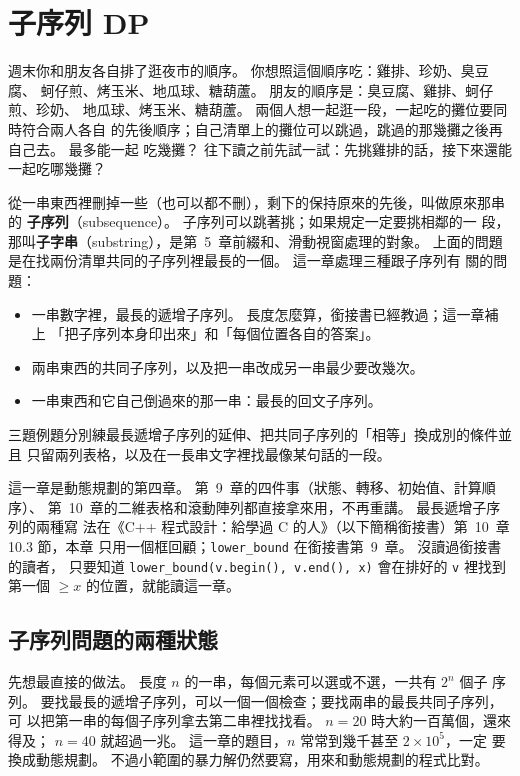 \chapter{子序列 DP}
\label{ch:subseq}

週末你和朋友各自排了逛夜市的順序。 你想照這個順序吃：雞排、珍奶、臭豆腐、
蚵仔煎、烤玉米、地瓜球、糖葫蘆。 朋友的順序是：臭豆腐、雞排、蚵仔煎、珍奶、
地瓜球、烤玉米、糖葫蘆。 兩個人想一起逛一段，一起吃的攤位要同時符合兩人各自
的先後順序；自己清單上的攤位可以跳過，跳過的那幾攤之後再自己去。 最多能一起
吃幾攤？ 往下讀之前先試一試：先挑雞排的話，接下來還能一起吃哪幾攤？

從一串東西裡刪掉一些（也可以都不刪），剩下的保持原來的先後，叫做原來那串的
\textbf{子序列}（subsequence）。 子序列可以跳著挑；如果規定一定要挑相鄰的一
段，那叫\textbf{子字串}（substring），是第~5~章前綴和、滑動視窗處理的對象。
上面的問題是在找兩份清單共同的子序列裡最長的一個。 這一章處理三種跟子序列有
關的問題：

\begin{itemize}
\item 一串數字裡，最長的遞增子序列。 長度怎麼算，銜接書已經教過；這一章補上
「把子序列本身印出來」和「每個位置各自的答案」。
\item 兩串東西的共同子序列，以及把一串改成另一串最少要改幾次。
\item 一串東西和它自己倒過來的那一串：最長的回文子序列。
\end{itemize}

三題例題分別練最長遞增子序列的延伸、把共同子序列的「相等」換成別的條件並且
只留兩列表格，以及在一長串文字裡找最像某句話的一段。

這一章是動態規劃的第四章。 第~9~章的四件事（狀態、轉移、初始值、計算順序）、
第~10~章的二維表格和滾動陣列都直接拿來用，不再重講。 最長遞增子序列的兩種寫
法在《C++ 程式設計：給學過 C 的人》（以下簡稱銜接書）第~10~章 10.3 節，本章
只用一個框回顧；\texttt{lower\_bound} 在銜接書第~9~章。 沒讀過銜接書的讀者，
只要知道 \texttt{lower\_bound(v.begin(), v.end(), x)} 會在排好的
\texttt{v} 裡找到第一個 $\ge x$ 的位置，就能讀這一章。

\section{子序列問題的兩種狀態}
\label{sec:ss-states}

先想最直接的做法。 長度 $n$ 的一串，每個元素可以選或不選，一共有 $2^n$ 個子
序列。 要找最長的遞增子序列，可以一個一個檢查；要找兩串的最長共同子序列，可
以把第一串的每個子序列拿去第二串裡找找看。 $n = 20$ 時大約一百萬個，還來得及；
$n = 40$ 就超過一兆。 這一章的題目，$n$ 常常到幾千甚至 $2 \times 10^5$，一定
要換成動態規劃。 不過小範圍的暴力解仍然要寫，用來和動態規劃的程式比對。


